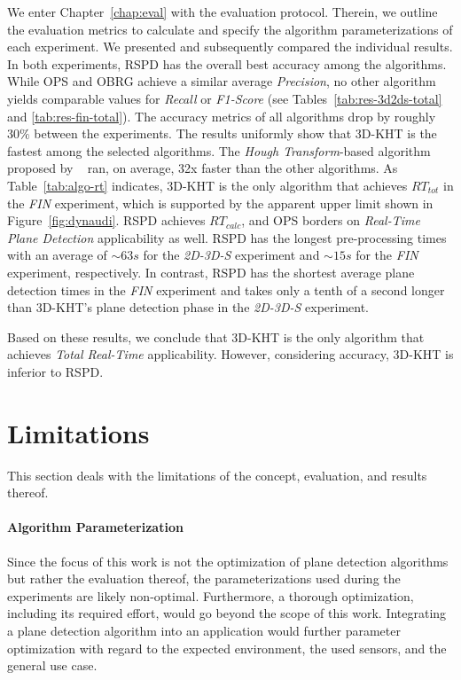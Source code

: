 \documentclass[main.tex]{subfiles}
\begin{document}
We enter Chapter~\ref{chap:eval} with the evaluation protocol. Therein, we outline the evaluation metrics to calculate and specify the algorithm parameterizations of each experiment. We presented and subsequently compared the individual results.
In both experiments, RSPD has the overall best accuracy among the algorithms. While OPS and OBRG achieve a similar average \textit{Precision}, no other algorithm yields comparable values for \textit{Recall} or \textit{F1-Score} (see Tables~\ref{tab:res-3d2ds-total} and \ref{tab:res-fin-total}). The accuracy metrics of all algorithms drop by roughly $30\%$ between the experiments.
The results uniformly show that 3D-KHT is the fastest among the selected algorithms. The \textit{Hough Transform}-based algorithm proposed by \citeauthor{LimbergerOliveira2015HT3D}~\cite{LimbergerOliveira2015HT3D} ran, on average, 32x faster than the other algorithms. As Table~\ref{tab:algo-rt} indicates, 3D-KHT is the only algorithm that achieves $RT_{tot}$ in the \textit{FIN} experiment, which is supported by the apparent upper limit shown in Figure~\ref{fig:dynaudi}. RSPD achieves $RT_{calc}$, and OPS borders on \textit{Real-Time Plane Detection} applicability as well. RSPD has the longest pre-processing times with an average of ${\sim}63s$ for the \textit{2D-3D-S} experiment and ${\sim}15s$ for the \textit{FIN} experiment, respectively. In contrast, RSPD has the shortest average plane detection times in the \textit{FIN} experiment and takes only a tenth of a second longer than 3D-KHT's plane detection phase in the \textit{2D-3D-S} experiment.

Based on these results, we conclude that 3D-KHT is the only algorithm that achieves \textit{Total Real-Time} applicability. However, considering accuracy, 3D-KHT is inferior to RSPD.


\section{Limitations}
This section deals with the limitations of the concept, evaluation, and results thereof.
\paragraph{Algorithm Parameterization}
Since the focus of this work is not the optimization of plane detection algorithms but rather the evaluation thereof, the parameterizations used during the experiments are likely non-optimal. Furthermore, a thorough optimization, including its required effort, would go beyond the scope of this work. 
Integrating a plane detection algorithm into an application would further parameter optimization with regard to the expected environment, the used sensors, and the general use case.
\end{document}
